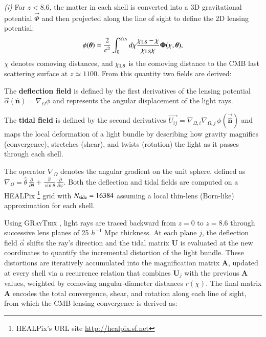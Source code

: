 \documentclass[]{aa} %
\newcommand{\vnh}{\hat{\mathbf n}}
\begin{document}
{\it (i)} For $z < 8.6$, the matter in each shell is converted into a 3D gravitational potential $\vec{\Phi}$ and then projected along the line of sight to define the 2D lensing potential:
\begin{equation}
 \phi (\vec{\theta}) = \frac{2}{c^2} \int_0^{\chi_{\rm LS}} d\chi \frac{\chi_{\rm LS}-\chi}{\chi_{\rm LS}\chi} \vec{\Phi} (\chi,\vec{\theta}),
\label{eq:lenseq1}
\end{equation}
$\chi$ denotes comoving distances, and $\chi_{\rm LS}$  is the comoving distance to the CMB last scattering surface at $z\simeq 1100$. From this quantity two fields are derived:
\begin{list}{}{}
    \item [\textbullet] The \textbf{deflection field} is defined by the first derivatives of the lensing potential $\vec{\alpha} (\vnh ) = \nabla_\Omega \phi$ and represents the angular displacement of the light rays.
    \item [\textbullet] The \textbf{tidal field} is defined by the second derivatives  $\vec{U_{ij}} = \nabla_{\Omega,i}\nabla_{\Omega,j}\,\phi(\vec{\vnh})$ and maps the local deformation of a light bundle by describing how gravity magnifies (convergence), stretches (shear), and twists (rotation) the light as it passes through each shell. 
\end{list}
The operator $\nabla_\Omega$ denotes the angular gradient on the unit sphere, defined as 
$\nabla_\Omega = \hat{\theta}\,\frac{\partial}{\partial \theta} + \frac{\hat{\varphi}}{\sin\theta}\,\frac{\partial}{\partial \varphi}$. Both the deflection and tidal fields are computed on a HEALPix \citep{healpix}\footnote{HEALPix's URL site \url{http://healpix.sf.net}} grid with $N_{\rm side} = 16384$ assuming a local thin-lens (Born-like) approximation for each shell. 

Using \textsc{GRayTrix} \citep{shirasaki2015probing}, light rays are traced backward from $z=0$ to $z = 8.6$  through successive lens planes of 25 $h^{-1}$ Mpc thickness. At each plane $j$, the deflection field $\vec{\alpha}$ shifts the ray's direction and the tidal matrix $\mathbf{U}$ is evaluated at the new coordinates to quantify the incremental distortion of the light bundle. These distortions are iteratively accumulated into the magnification matrix $\mathbf{A}$, updated at every shell via a recurrence relation that combines $\mathbf{U}_j$ with the previous $\mathbf{A}$ values, weighted by comoving angular-diameter distances $r(\chi)$. The final matrix $\mathbf{A}$ encodes the total convergence, shear, and rotation along each line of sight, from which the CMB lensing convergence is derived as:
\end{document}

